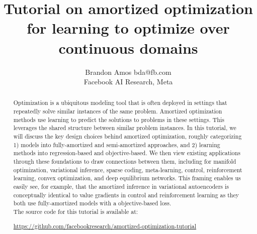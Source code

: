 \documentclass[twoside,11pt]{article}
\begin{document}
\title{Tutorial on amortized optimization for
learning to optimize over continuous domains}
\author{\name Brandon Amos \email bda@fb.com \\
  \addr Facebook AI Research, Meta}
\editor{}

\maketitle

\begin{abstract}
  Optimization is a ubiquitous modeling tool that is often
  deployed in settings that repeatedly solve similar
  instances of the same problem.
  Amortized optimization methods use learning to predict
  the solutions to problems in these settings.
  This leverages the shared structure between
  similar problem instances.
  In this tutorial, we will discuss the key design choices
  behind amortized optimization,
  roughly categorizing 1) models into fully-amortized
  and semi-amortized approaches, and 2) learning methods
  into regression-based and objective-based.
  We then view existing applications through these
  foundations to draw connections between them,
  including for manifold optimization, variational inference,
  sparse coding, meta-learning, control, reinforcement learning,
  convex optimization, and deep equilibrium networks.
  This framing enables us easily see, for example, that the
  amortized inference in variational autoencoders is conceptually
  identical to value gradients in control and reinforcement
  learning as they both use fully-amortized models with
  a objective-based loss. \\

  \noindent The source code for this tutorial is available at:
  \begin{center}
  \url{https://github.com/facebookresearch/amortized-optimization-tutorial}
  \end{center}
\end{abstract}

\newpage
\setcounter{tocdepth}{2}
\tableofcontents

\newpage
\end{document}
